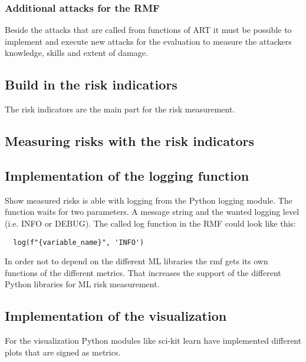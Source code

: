\subsubsection*{Additional attacks for the RMF}

Beside the attacks that are called from functions of ART it must be possible to implement and execute new attacks for the evaluation to measure the attackers knowledge, skills and extent
of damage.

\subsection{Build in the risk indicatiors}

The risk indicators are the main part for the risk measurement.

\subsection{Measuring risks with the risk indicators}

\subsection{Implementation of the logging function}

Show measured risks is able with logging from the Python logging module. The function waits for two parameters. A message string and the wanted logging level (i.e. INFO or DEBUG). The called log function in the RMF could look like this:
\begin{lstlisting}
  log(f"{variable_name}", 'INFO')
\end{lstlisting}

In order not to depend on the different ML libraries the rmf gets its own functions of the different metrics. That increases the support of the different Python libraries for ML risk measurement.

\subsection{Implementation of the visualization}

For the visualization Python modules like sci-kit learn have implemented different plots that are signed as metrics.
